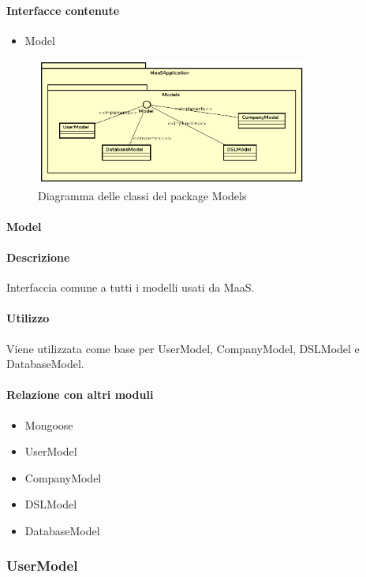 \paragraph*{Interfacce contenute}
\begin{itemize}
\item Model
\end{itemize}

\begin{figure}[H]
\centering
\includegraphics[width=0.8\textwidth]{res/sections/backend/models.png}
\caption{Diagramma delle classi del package Models}
\end{figure}

\paragraph{Model}
\paragraph*{Descrizione}
Interfaccia comune a tutti i modelli usati da MaaS.

\paragraph*{Utilizzo}
Viene utilizzata come base per UserModel, CompanyModel, DSLModel e DatabaseModel.

\paragraph*{Relazione con altri moduli}
\begin{itemize}
\item Mongoose
\item UserModel
\item CompanyModel
\item DSLModel
\item DatabaseModel
\end{itemize}

\subsubsection{UserModel}
